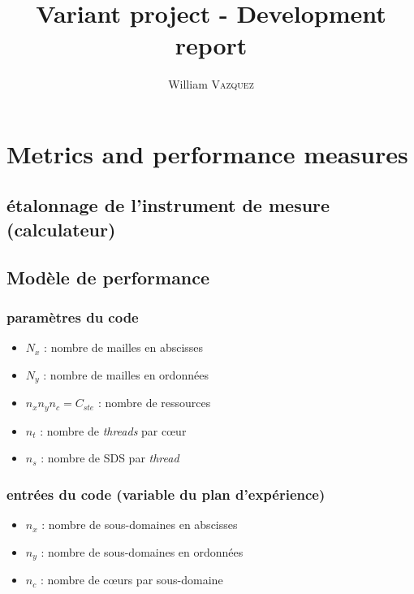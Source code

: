 \documentclass[12pt]{memoir}
\begin{document}
\pagestyle{kbasic}


\title{Variant project - Development report}
\author{William \textsc{Vazquez}}

\maketitle
\tableofcontents

\chapter{Metrics and performance measures}


\section{\'etalonnage de l'instrument de mesure (calculateur)}

\section{Modèle de performance}

\subsection*{paramètres du code}
\begin{itemize}
\item $N_x$ : nombre de mailles en abscisses
\item $N_y$ : nombre de mailles en ordonnées
\item $n_x n_y n_c = C_{ste}$ : nombre de ressources
\item $n_t$ : nombre de \textit{threads} par c\oe ur
\item $n_s$ : nombre de SDS par \textit{thread}
\end{itemize}

\subsection*{entrées du code (variable du plan d'expérience)}
\begin{itemize}
\item $n_x$ : nombre de sous-domaines en abscisses
\item $n_y$ : nombre de sous-domaines en ordonnées
\item $n_c$ : nombre de c\oe urs par sous-domaine
\end{itemize}
\end{document}
